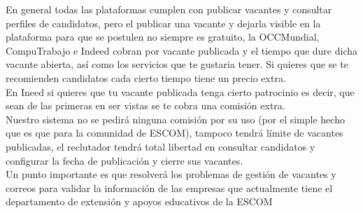 En general todas las plataformas cumplen con publicar vacantes y consultar perfiles de candidatos, pero el publicar una vacante y dejarla visible en la plataforma para que se postulen no siempre es gratuito, la OCCMundial, CompuTrabajo e Indeed cobran por vacante publicada y el tiempo que dure dicha vacante abierta, así como los servicios que te gustaria tener. Si quieres que se te recomienden candidatos cada cierto tiempo tiene un precio extra.\\

En Ineed si quieres que tu vacante publicada tenga cierto patrocinio es decir, que sean de las primeras en ser vistas se te cobra una comisión extra.\\
\newline
Nuestro sistema no se pedirá ninguna comisión por su uso (por el simple hecho que es que para la comunidad de ESCOM), tampoco tendrá límite de vacantes publicadas, el reclutador tendrá total libertad en consultar candidatos y configurar la fecha de publicación y cierre sus vacantes. \\

Un punto importante es que resolverá los problemas de gestión de vacantes  y correos para validar la información de las empresas que actualmente tiene el departamento de extensión y apoyos educativos de la ESCOM
